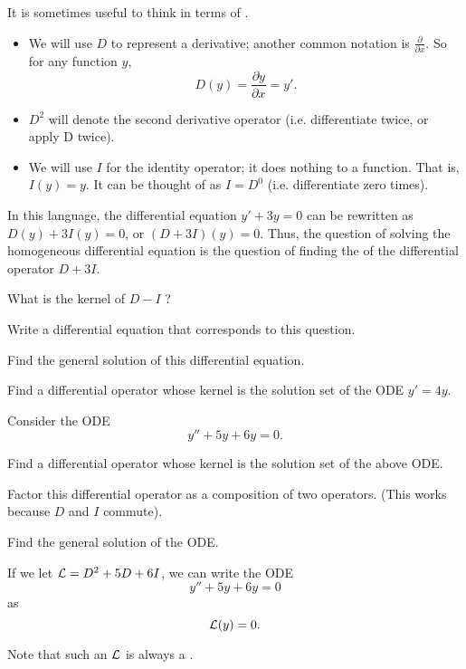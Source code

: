 
\begin{applicationActivities}

\begin{observation}
It is sometimes useful to think in terms of .
\begin{itemize}
\item We will use \(D\) to represent a derivative; another common notation is \(\frac{\partial}{\partial x}\).  So for any function \(y\),  \[D(y)=\frac{\partial y}{\partial x}=y'.\]
\item \(D^2\) will denote the second derivative operator (i.e. differentiate twice, or apply D twice).
\item We will use \(I\) for the identity operator; it does nothing to a function.  That is, \(I(y)=y\).  It can be thought of as \(I=D^0\) (i.e. differentiate zero times).
\end{itemize}
\vfill
In this language, the differential equation \(y'+3y=0\) can be rewritten as \(D(y)+3I(y)=0\), or \( (D+3I)(y)=0\).
\vfill
Thus, the question of solving the homogeneous differential equation is the question of finding the  of the differential operator \(D+3I\).
\end{observation}

\begin{activity}{5}
What is the kernel of \(D-I\) ?
\vfill
\begin{subactivity}
Write a differential equation that corresponds to this question.
\end{subactivity}
\begin{subactivity}
Find the general solution of this differential equation.
\end{subactivity}
\end{activity}

\begin{activity}{5}
Find a differential operator whose kernel is the solution set of the ODE \(y'=4y\).
\end{activity}

\begin{activity}{10}
Consider the ODE \[y''+5y+6y=0.\]
\vfill
\begin{subactivity}
Find a differential operator whose kernel is the solution set of the above ODE.
\end{subactivity}
\begin{subactivity}
Factor this differential operator as a composition of two operators. (This works because \(D\) and \(I\) commute).
\end{subactivity}
\begin{subactivity}
Find the general solution of the ODE.
\end{subactivity}
\end{activity}

\begin{observation}
If we let \(\mathcal{L}=D^2+5D+6I\), we can write the ODE \[y''+5y+6y=0\] as \[\mathcal{L}(y)=0.\]

Note that such an \(\mathcal{L}\) is always a .
\end{observation}



\end{applicationActivities}
